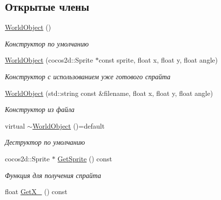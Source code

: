 \subsection*{Открытые члены}
\begin{DoxyCompactItemize}
\item 
\mbox{\label{classrtm_1_1_world_object_af44479be3cee7dd4de4d197adbb5afab}} 
\hyperlink{classrtm_1_1_world_object_af44479be3cee7dd4de4d197adbb5afab}{World\+Object} ()
\begin{DoxyCompactList}\small\item\em Конструктор по умолчанию \end{DoxyCompactList}\item 
\hyperlink{classrtm_1_1_world_object_a1a1196480079afe397f64055f333f83c}{World\+Object} (cocos2d\+::\+Sprite $\ast$const sprite, float x, float y, float angle)
\begin{DoxyCompactList}\small\item\em Конструктор с использованием уже готового спрайта \end{DoxyCompactList}\item 
\hyperlink{classrtm_1_1_world_object_a4462c860b41708d4570352dc3372064e}{World\+Object} (std\+::string const \&filename, float x, float y, float angle)
\begin{DoxyCompactList}\small\item\em Конструктор из файла \end{DoxyCompactList}\item 
\mbox{\label{classrtm_1_1_world_object_a06dbc49bfcfa403a842ebe1f316763e0}} 
virtual \hyperlink{classrtm_1_1_world_object_a06dbc49bfcfa403a842ebe1f316763e0}{$\sim$\+World\+Object} ()=default
\begin{DoxyCompactList}\small\item\em Деструктор по умолчанию \end{DoxyCompactList}\item 
cocos2d\+::\+Sprite $\ast$ \hyperlink{classrtm_1_1_world_object_af0284b8fdc5a7ff8893d020d630a7fe5}{Get\+Sprite} () const
\begin{DoxyCompactList}\small\item\em Функция для получения спрайта \end{DoxyCompactList}\item 
float \hyperlink{classrtm_1_1_world_object_a31f148a74be54e4f1ccbf41fc8424552}{Get\+X\+\_\+} () const

\end{DoxyCompactItemize}
